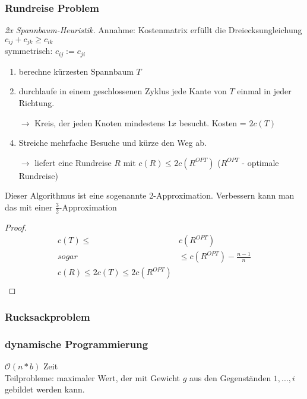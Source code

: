\subsubsection{Rundreise Problem}
\emph{2x Spannbaum-Heuristik.}
Annahme: Kostenmatrix erfüllt die Dreiecksungleichung $c_{ij}+c_{jk} \geq c_{ik}$\\
symmetrisch: $c_{ij}:= c_{ji} $\\
\begin{enumerate}
\item berechne kürzesten Spannbaum $T$\\
\item durchlaufe in einem geschlossenen Zyklus jede Kante von $T$ einmal in jeder Richtung.\\
\item[$\rightarrow$] Kreis, der jeden Knoten mindestens $1x$ besucht. Kosten = $2 c(T)$\\
\item Streiche mehrfache Besuche und kürze den Weg ab.\\
\item[$\rightarrow$] liefert eine Rundreise $R$ mit $c(R) \leq 2 c(R^{OPT})$ ($R^{OPT}$ - optimale Rundreise)\\
\end{enumerate}
Dieser Algorithmus ist eine sogenannte 2-Approximation. Verbessern kann man das mit einer $\frac{3}{2}$-Approximation\\
\begin{proof}
\begin{align*}
c(T) \leq & c(R^{OPT})\\
sogar & \leq c(R^{OPT}) - \frac{n-1}{n}\\
c(R) \leq 2c(T) \leq 2c(R^{OPT})\\
\end{align*}
\end{proof}
\subsubsection{Rucksackproblem}
\subsubsection*{dynamische Programmierung}
$\mathcal{O}(n*b)$ Zeit\\
Teilprobleme: maximaler Wert, der mit Gewicht $g$ aus den Gegenständen $1,...,i$ gebildet werden kann.
